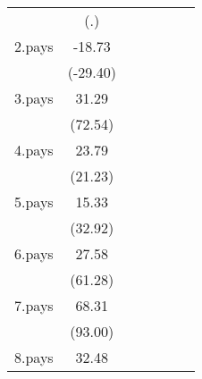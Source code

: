 {\begin{tabular}{l*{6}{c}}
                    &         (.)         &                     &                     &                     &                     &                     \\
[1em]
2.pays              &      -18.73\sym{***}&                     &                     &                     &                     &                     \\
                    &    (-29.40)         &                     &                     &                     &                     &                     \\
[1em]
3.pays              &       31.29\sym{***}&                     &                     &                     &                     &                     \\
                    &     (72.54)         &                     &                     &                     &                     &                     \\
[1em]
4.pays              &       23.79\sym{***}&                     &                     &                     &                     &                     \\
                    &     (21.23)         &                     &                     &                     &                     &                     \\
[1em]
5.pays              &       15.33\sym{***}&                     &                     &                     &                     &                     \\
                    &     (32.92)         &                     &                     &                     &                     &                     \\
[1em]
6.pays              &       27.58\sym{***}&                     &                     &                     &                     &                     \\
                    &     (61.28)         &                     &                     &                     &                     &                     \\
[1em]
7.pays              &       68.31\sym{***}&                     &                     &                     &                     &                     \\
                    &     (93.00)         &                     &                     &                     &                     &                     \\
[1em]
8.pays              &       32.48\sym{***}&                     &                     &                     &                     &                     \\

\end{tabular}}
